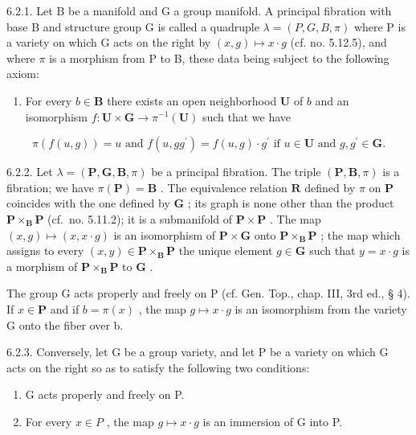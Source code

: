 6.2.1. Let B be a manifold and G a group manifold. A principal fibration with base B and structure group G is called a quadruple \(\lambda = (P, G, B, \pi)\) where P is a variety on which G acts on the right by \((x, g) \mapsto x \cdot g\) (cf. no. 5.12.5), and where \(\pi\) is a morphism from P to B, these data being subject to the following axiom:

\begin{enumerate}
\def\labelenumi{(\Alph{enumi})}
\setcounter{enumi}{15}
\tightlist
\item
  For every \(b \in \mathbf{B}\) there exists an open neighborhood \(\mathbf{U}\) of \(b\) and an isomorphism \(f: \mathbf{U} \times \mathbf{G} \to \pi^{-1}(\mathbf{U})\) such that we have
\end{enumerate}

\[
\pi (f (u, g)) = u \text {   and   } f (u, g g ^ {\prime}) = f (u, g) \cdot g ^ {\prime} \text {   if   } u \in \mathbf {U} \text {   and   } g, g ^ {\prime} \in \mathbf {G}.
\]

6.2.2. Let \(\lambda = (\mathbf{P}, \mathbf{G}, \mathbf{B}, \pi)\) be a principal fibration. The triple \((\mathbf{P}, \mathbf{B}, \pi)\) is a fibration; we have \(\pi(\mathbf{P}) = \mathbf{B}\) . The equivalence relation \(\mathbf{R}\) defined by \(\pi\) on \(\mathbf{P}\) coincides with the one defined by \(\mathbf{G}\) ; its graph is none other than the product \(\mathbf{P} \times_{\mathbf{B}} \mathbf{P}\) (cf.~no. 5.11.2); it is a submanifold of \(\mathbf{P} \times \mathbf{P}\) . The map \((x, g) \mapsto (x, x \cdot g)\) is an isomorphism of \(\mathbf{P} \times \mathbf{G}\) onto \(\mathbf{P} \times_{\mathbf{B}} \mathbf{P}\) ; the map which assigns to every \((x, y) \in \mathbf{P} \times_{\mathbf{B}} \mathbf{P}\) the unique element \(g \in \mathbf{G}\) such that \(y = x \cdot g\) is a morphism of \(\mathbf{P} \times_{\mathbf{B}} \mathbf{P}\) to \(\mathbf{G}\) .

The group G acts properly and freely on P (cf. Gen. Top., chap. III, 3rd ed., § 4). If \(x \in \mathbf{P}\) and if \(b = \pi(x)\) , the map \(g \mapsto x \cdot g\) is an isomorphism from the variety G onto the fiber over b.

6.2.3. Conversely, let G be a group variety, and let P be a variety on which G acts on the right so as to satisfy the following two conditions:

\begin{enumerate}
\def\labelenumi{(\alph{enumi})}
\item
  G acts properly and freely on P.
\item
  For every \(x \in P\) , the map \(g \mapsto x \cdot g\) is an immersion of G into P.
\end{enumerate}

